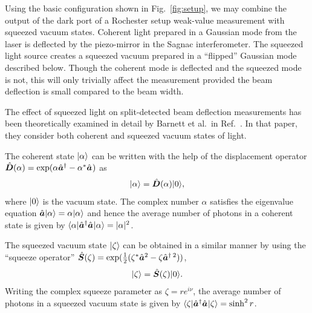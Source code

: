 Using the basic configuration shown in Fig.~\ref{fig:setup}, we may combine the output of the dark port of a Rochester setup weak-value measurement with squeezed vacuum states. Coherent light prepared in a Gaussian mode from the laser is deflected by the piezo-mirror in the Sagnac interferometer.  The squeezed light source creates a squeezed vacuum prepared in a ``flipped'' Gaussian mode described below.  Though the coherent mode is deflected and the squeezed mode is not, this will only trivially affect the measurement provided the beam deflection is small compared to the beam width.     

The effect of squeezed light on split-detected beam deflection measurements has been theoretically examined in detail by Barnett et al.\ in Ref.~\cite{Barnett2003}.  In that paper, they consider both coherent and squeezed vacuum states of light.

The coherent state $\lvert \alpha\rangle$ can be written with the help of the displacement operator $\hat{\bm D}(\alpha) = \exp(\alpha \hat{\bm a}^\dagger_{} - \alpha^{*} \hat{\bm a}_{})$ as
\begin{align}\label{eq:displacementop}
\lvert \alpha\rangle = \hat{\bm D}(\alpha) \lvert 0\rangle,
\end{align}
where $\lvert 0\rangle$ is the vacuum state.  The complex number $\alpha$ satisfies the eigenvalue equation $\hat{\bm a}\lvert \alpha\rangle = \alpha\lvert \alpha\rangle$ and hence the average number of photons in a coherent state is given by $\langle \alpha \rvert\hat{\bm a}^\dagger_{}\hat{\bm a}_{}\lvert \alpha\rangle = |\alpha |^2$.

The squeezed vacuum state $\lvert \zeta\rangle$ can be obtained in a similar manner by using the ``squeeze operator'' $\hat{\bm S}(\zeta) = \exp(\frac{1}{2}(\zeta^{*}\hat{\bm a}_{}^2 - \zeta \hat{\bm a}^{\dagger\: 2}))$,
\begin{align}
\lvert \zeta\rangle = \hat{\bm S}(\zeta)\lvert 0\rangle.
\end{align}
Writing the complex squeeze parameter as $\zeta = re^{i\nu}$, the average number of photons in a squeezed vacuum state is given by $\langle \zeta \rvert\hat{\bm a}^\dagger_{}\hat{\bm a}_{}\lvert \zeta\rangle = \sinh^2 r$.

